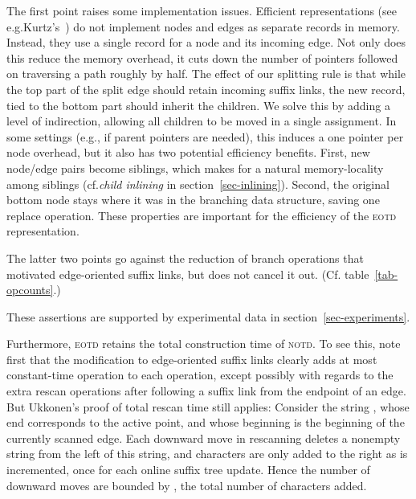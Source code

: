 \documentclass{llncs}
\newcommand\notd{\textsc{notd}\xspace}
\newcommand\eotd{\textsc{eotd}\xspace}
\begin{document}
The first point raises some implementation issues. Efficient representations
(see e.g.\@ Kurtz's~\cite{kurtzsuftree}) do not implement nodes and edges as
separate records in memory. Instead, they use a single record for a node and
its incoming edge. Not only does this reduce the memory overhead, it cuts down
the number of pointers followed on traversing a path roughly by half. The
effect of our splitting rule is that while the top part of the split edge
should retain incoming suffix links, the new record, tied to the bottom part
should inherit the children. We solve this by adding a level of indirection,
allowing all children to be moved in a single assignment. In some settings
(e.g., if parent pointers are needed), this induces a one
pointer per node overhead, but it also has two potential efficiency
benefits. First, new node/edge pairs become siblings, which makes for a natural
memory-locality among siblings (cf.\@ \emph{child inlining} in
section~\ref{sec-inlining}).\label{sec-notechildcache} Second, the original bottom node stays where it was
in the branching data structure, saving one replace operation. These properties
are important for the efficiency of the \eotd representation.

The latter two points go against the reduction of branch operations that
motivated edge-oriented suffix links, but does not cancel it out. (Cf.\@
table~\ref{tab-opcounts}.)

These assertions are supported by experimental data in
section~\ref{sec-experiments}.

Furthermore, \eotd retains the  total construction time of \notd. To see this, note
first that the modification to edge-oriented suffix links clearly adds at most
constant-time operation to each operation, except possibly with regards to the
extra rescan operations after following a suffix link from the endpoint of an
edge. But Ukkonen's proof of total  rescan time still applies: Consider
the string , whose end corresponds to the active point, and
whose beginning is the beginning of the currently scanned edge. Each downward
move in rescanning deletes a nonempty string from the left of this string, and
characters are only added to the right as  is incremented, once for each
online suffix tree update. Hence the number of downward moves are bounded by
, the total number of characters added.


\newcommand\stylescale{.635}
\end{document}
